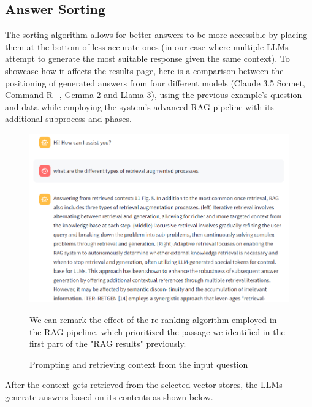 \subsection{Answer Sorting}
The sorting algorithm allows for better answers to be more accessible by placing them at the bottom of less accurate ones (in our case where multiple LLMs attempt to generate the most suitable response given the same context).
To showcase how it affects the results page, here is a comparison between the positioning of generated answers from four different models (Claude 3.5 Sonnet, Command R+, Gemma-2 and Llama-3), using the previous example's question and data while employing the system's advanced RAG pipeline with its additional subprocess and phases.
\begin{figure}[H]
    \centering
    \includegraphics[width=\linewidth]{./figures/app-question.png}
    \caption{Prompting and retrieving context from the input question}
    \begin{flushleft}
        We can remark the effect of the re-ranking algorithm employed in the RAG pipeline, which prioritized the passage we identified in the first part of the "RAG results" previously.
    \end{flushleft}
\end{figure}
After the context gets retrieved from the selected vector stores, the LLMs generate answers based on its contents as shown below.
